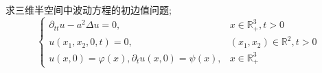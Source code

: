 \documentclass[../../main.tex]{subfiles}
\begin{document}
\begin{problem}
    求三维半空间中波动方程的初边值问题; \[
    \begin{cases}  \partial _{tt}u-a^{2} \Delta u= 0,&x\in \mathbb{R} _{+ }^{3},t> 0\\ 
     u\left( x_1,x_2,0,t \right)= 0,&\left( x_1,x_2 \right)\in \mathbb{R} ^{2},t> 0\\ 
      u\left( x,0 \right)=  \varphi \left( x \right), \partial _{t}u\left( x,0 \right)= \psi \left( x \right),&x\in \mathbb{R} _{+ }^{3}       \end{cases} 
    \]
\end{problem}
\end{document}
